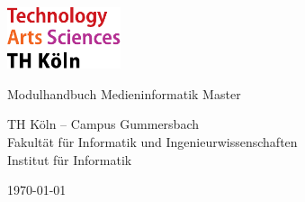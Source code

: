 
\begin{titlepage}

	\includegraphics[width=0.25\textwidth]{../../../assets/logo_th_koeln.pdf}

	\vspace{2cm}
	{\Huge\singlespacing\raggedright Modulhandbuch Medieninformatik Master\par}
	\vspace{1cm}
	{\Large TH Köln – Campus Gummersbach \\ Fakultät für Informatik und Ingenieurwissenschaften \\ Institut für Informatik\par}

	\vfill

	{\large \today\par}
\end{titlepage}
